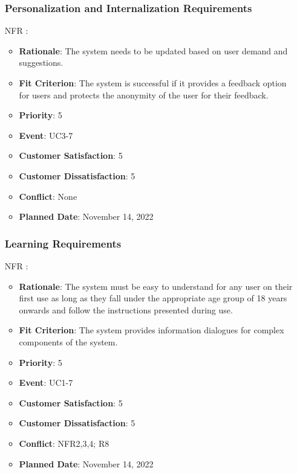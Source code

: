 \documentclass[12pt, titlepage]{article}
\newcounter{reqnum} %
\newcounter{freqnum} %
\begin{document}
\begin{itemize}
\subsubsection{Personalization and Internalization Requirements}

\item[NFR\refstepcounter{freqnum}\thefreqnum
\label{NFR}:] 
\begin{itemize}
    \item \textbf{Rationale}: The system needs to be updated based on user demand and suggestions.
    \item \textbf{Fit Criterion}: The system is successful if it provides a feedback option for users and protects the anonymity of the user for their feedback.
    \item \textbf{Priority}: 5
    \item \textbf{Event}: UC3-7%
    \item \textbf{Customer Satisfaction}: 5
    \item \textbf{Customer Dissatisfaction}: 5
    \item \textbf{Conflict}: None
    \item \textbf{Planned Date}: November 14, 2022
\end{itemize}
\subsubsection{Learning Requirements}

\item[NFR\refstepcounter{freqnum}\thefreqnum
\label{NFR}:] 
\begin{itemize}
    \item \textbf{Rationale}: The system must be easy to understand for any user on their first use as long as they fall under the appropriate age group of 18 years onwards and follow the instructions presented during use.
    \item \textbf{Fit Criterion}: The system provides information dialogues for complex components of the system.
    \item \textbf{Priority}: 5
    \item \textbf{Event}: UC1-7 %
    \item \textbf{Customer Satisfaction}: 5
    \item \textbf{Customer Dissatisfaction}: 5
    \item \textbf{Conflict}: NFR2,3,4; R8
    \item \textbf{Planned Date}: November 14, 2022
\end{itemize}

\end{itemize}
\end{document}
